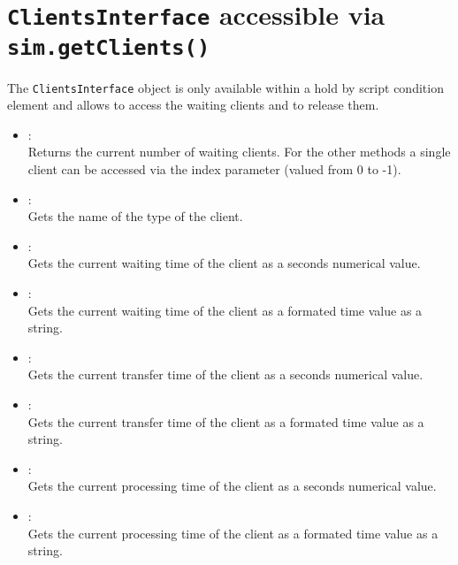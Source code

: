 \chapter{\texttt{ClientsInterface} accessible via \texttt{sim.getClients()}}

The \texttt{ClientsInterface} object is only available within a hold by script condition element
and allows to access the waiting clients and to release them.

\begin{itemize}

\item
{}:\\
Returns the current number of waiting clients. For the other
methods a single client can be accessed via the index parameter
(valued from 0 to -1).

\item
{}:\\
Gets the name of the type of the client.

\item
{}:\\
Gets the current waiting time of the client as a seconds numerical value.

\item
{}:\\
Gets the current waiting time of the client as a formated time value as a string.

\item
{}:\\
Gets the current transfer time of the client as a seconds numerical value.

\item
{}:\\
Gets the current transfer time of the client as a formated time value as a string.

\item
{}:\\
Gets the current processing time of the client as a seconds numerical value.

\item
{}:\\
Gets the current processing time of the client as a formated time value as a string.


\end{itemize}
